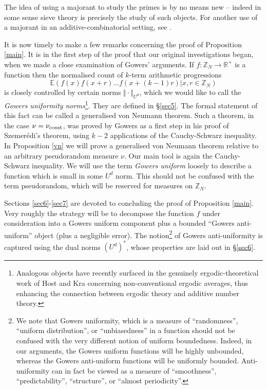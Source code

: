 \documentclass[12pt,a4paper,reqno]{amsart}
\numberwithin{equation}{section}
\theoremstyle{plain}
\theoremstyle{definition}
\def\vconst{\ensuremath \nu_{\mbox{\scriptsize const}}}
\def\E{{\mathbb E}}
\def\R{{\mathbb R}}
\def\vs{\vspace{11pt}}
\def\ni{\noindent}
\begin{document}
\ni The idea of using a majorant to study the primes is by no means new -- indeed in some sense sieve theory is precisely the study of such objects. For another use of a majorant in an additive-combinatorial setting, see \cite{ramare,ramare-ruzsa}. \vs

\ni It is now timely to make a few remarks concerning the proof of Proposition \ref{main}. It is in the first step of the proof that our original investigations began, when we made a close examination of Gowers' arguments. If $f : \mathbb{Z}_N \rightarrow \R^+$ is a function then the normalised count of $k$-term arithmetic progressions
\begin{equation}\label{apcount}  \E( f(x) f(x+r) \ldots f(x+(k-1)r) | x,r \in \mathbb{Z}_N)\end{equation} 
is closely controlled by certain norms $\Vert \cdot \Vert_{U^d}$, which we would like to call the \textit{Gowers uniformity norms}\footnote{Analogous objects have recently surfaced in the genuinely ergodic-theoretical work of Host and Kra \cite{host-kra1,host-kra2,host-kra3} concerning non-conventional ergodic averages, thus enhancing the connection between ergodic theory and additive number theory.}. They are defined in \S \ref{sec5}. The formal statement of this fact can be called a generalised von Neumann theorem. Such a theorem, in the case $\nu = \vconst$, was proved by Gowers \cite{gowers} as a first step in his proof of Szemer\'edi's theorem, using $k-2$ applications of the Cauchy-Schwarz inequality. In Proposition \ref{vn} we will prove a generalised von Neumann theorem relative to an arbitrary pseudorandom measure $\nu$. Our main tool is again the Cauchy-Schwarz inequality. We will use the term \textit{Gowers uniform} loosely to describe a function which is small in some $U^d$ norm. This should not be confused with the term pseudorandom, which will be reserved for measures on $\mathbb{Z}_N$.\vs

\ni Sections \ref{sec6}-\ref{sec7} are devoted to concluding the proof of Proposition \ref{main}. Very roughly the strategy will be to decompose the function $f$ under consideration into a Gowers uniform component plus a bounded ``Gowers anti-uniform'' object (plus a negligible error). The notion\footnote{We note that Gowers uniformity, which is a measure of ``randomness'', ``uniform distribution'', or ``unbiasedness'' in a function should not be confused with the very different notion of uniform boundedness.  Indeed, in our arguments, the Gowers uniform functions will be highly unbounded, whereas the Gowers anti-uniform functions will be uniformly bounded.  Anti-uniformity can in fact be viewed as a measure of ``smoothness'', ``predictability'', ``structure'', or ``almost periodicity''.} of Gowers anti-uniformity is captured using the dual norms $(U^d)^*$, whose properties are laid out in \S \ref{sec6}.\vs
\end{document}
